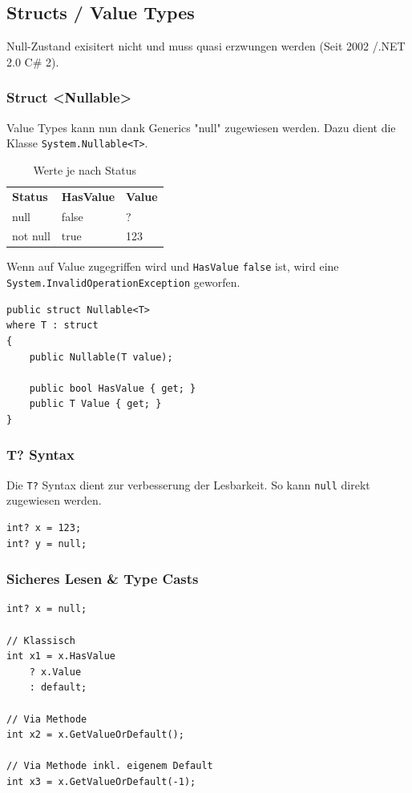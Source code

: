 \documentclass[
a4paper,
oneside,
10pt,
fleqn,
headsepline,
toc=listofnumbered, 
bibliography=totocnumbered]{scrartcl}
\begin{document}
\subsection{Structs / Value Types}
Null-Zustand exisitert nicht und muss quasi erzwungen werden (Seit 2002 /.NET 2.0 C\# 2).

\subsubsection{Struct <Nullable>}
Value Types kann nun dank Generics "null" zugewiesen werden. Dazu dient die Klasse \lstinline|System.Nullable<T>|.
\begin{table}[ht]
	\centering
	\begin{tabular}{lll}
		\textbf{Status} & \textbf{HasValue} & \textbf{Value} \\
		null            & false             & ?              \\
		not null        & true              & 123
	\end{tabular}
	\caption{Werte je nach Status}
\end{table}

Wenn auf Value zugegriffen wird und \lstinline|HasValue| \lstinline|false| ist, wird eine \lstinline|System.InvalidOperationException| geworfen.

\begin{lstlisting}
public struct Nullable<T>
where T : struct
{
	public Nullable(T value);

	public bool HasValue { get; }
	public T Value { get; }
}
\end{lstlisting}

\subsubsection{T? Syntax}
Die \lstinline|T?| Syntax dient zur verbesserung der Lesbarkeit. So kann \lstinline|null| direkt zugewiesen werden.
\begin{lstlisting}
int? x = 123;
int? y = null;
\end{lstlisting}

\subsubsection{Sicheres Lesen \& Type Casts}
\begin{lstlisting}
int? x = null;

// Klassisch
int x1 = x.HasValue
	? x.Value
	: default;

// Via Methode
int x2 = x.GetValueOrDefault();

// Via Methode inkl. eigenem Default
int x3 = x.GetValueOrDefault(-1);
\end{lstlisting}
\end{document}
